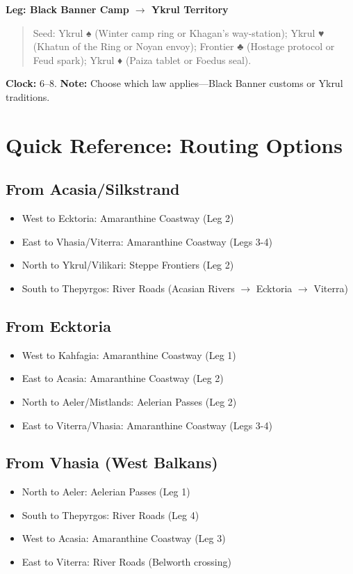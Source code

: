 \documentclass[12pt,oneside]{book}
\renewcommand{\spadesuit}{♠}
\renewcommand{\heartsuit}{♥}
\renewcommand{\clubsuit}{♣}
\renewcommand{\diamondsuit}{♦}
\begin{document}
\textbf{Leg: Black Banner Camp $\rightarrow$ Ykrul Territory}
\begin{quote}
Seed: Ykrul \spadesuit{} (Winter camp ring or Khagan's way-station); Ykrul \heartsuit{} (Khatun of the Ring or Noyan envoy); Frontier \clubsuit{} (Hostage protocol or Feud spark); Ykrul \diamondsuit{} (Paiza tablet or Foedus seal).
\end{quote}
\textbf{Clock:} 6--8. \textbf{Note:} Choose which law applies---Black Banner customs or Ykrul traditions.

\section{Quick Reference: Routing Options}

\subsection{From Acasia/Silkstrand}
\begin{itemize}
\item West to Ecktoria: Amaranthine Coastway (Leg 2)
\item East to Vhasia/Viterra: Amaranthine Coastway (Legs 3-4)
\item North to Ykrul/Vilikari: Steppe Frontiers (Leg 2)
\item South to Thepyrgos: River Roads (Acasian Rivers $\rightarrow$ Ecktoria $\rightarrow$ Viterra)
\end{itemize}

\subsection{From Ecktoria}
\begin{itemize}
\item West to Kahfagia: Amaranthine Coastway (Leg 1)
\item East to Acasia: Amaranthine Coastway (Leg 2)
\item North to Aeler/Mistlands: Aelerian Passes (Leg 2)
\item East to Viterra/Vhasia: Amaranthine Coastway (Legs 3-4)
\end{itemize}

\subsection{From Vhasia (West Balkans)}
\begin{itemize}
\item North to Aeler: Aelerian Passes (Leg 1)
\item South to Thepyrgos: River Roads (Leg 4)
\item West to Acasia: Amaranthine Coastway (Leg 3)
\item East to Viterra: River Roads (Belworth crossing)
\end{itemize}
\end{document}
